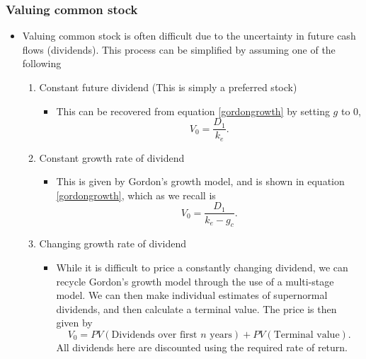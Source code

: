 \documentclass[../notes_compiled.tex]{subfiles}
\begin{document}
\subsubsection{Valuing common stock}
\begin{itemize}
\item Valuing common stock is often difficult due to the uncertainty in future cash flows (dividends). This process can be simplified by assuming one of the following
\begin{enumerate}
\item Constant future dividend (This is simply a preferred stock)
\begin{itemize}
\item This can be recovered from equation \ref{gordongrowth} by setting $g$ to 0,
\begin{equation}
V_{0} = \frac{D_{1}}{k_{e}}.
\end{equation}
\end{itemize}
\item Constant growth rate of dividend
\begin{itemize}
\item This is given by Gordon’s growth model, and is shown in equation \ref{gordongrowth}, which as we recall is
\begin{equation*}
V_{0} = \frac{D_{1}}{k_{e}-g_{c}}.
\end{equation*}
\end{itemize}
\item Changing growth rate of dividend
\begin{itemize}
\item While it is difficult to price a constantly changing dividend, we can recycle Gordon’s growth model through the use of a multi-stage model. We can then make individual estimates of supernormal dividends, and then calculate a terminal value. The price is then given by
\begin{equation}
V_{0} = PV(\text{Dividends over first $n$ years}) + PV(\text{Terminal value}).
\end{equation}
All dividends here are discounted using the required rate of return.
\end{itemize}
\end{enumerate}
\end{itemize}
\end{document}
